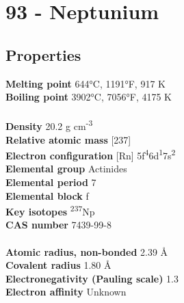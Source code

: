 \section{93 - Neptunium}
\label{sec:elem-neptunium}
\subsection{Properties}
\textbf{Melting point} 644°C, 1191°F, 917 K\\
\textbf{Boiling point} 3902°C, 7056°F, 4175 K\\
\\
\textbf{Density} 20.2 g cm\textsuperscript{-3}\\
\textbf{Relative atomic mass} [237]\\
\textbf{Electron configuration} [Rn] 5f\textsuperscript{4}6d\textsuperscript{1}7s\textsuperscript{2}\\
\textbf{Elemental group} Actinides\\
\textbf{Elemental period} 7\\
\textbf{Elemental block} f\\
\textbf{Key isotopes} \textsuperscript{237}Np\\
\textbf{CAS number} 7439-99-8\\
\\
\textbf{Atomic radius, non-bonded} 2.39 Å\\
\textbf{Covalent radius} 1.80 Å\\
\textbf{Electronegativity (Pauling scale)} 1.3\\
\textbf{Electron affinity} Unknown\\